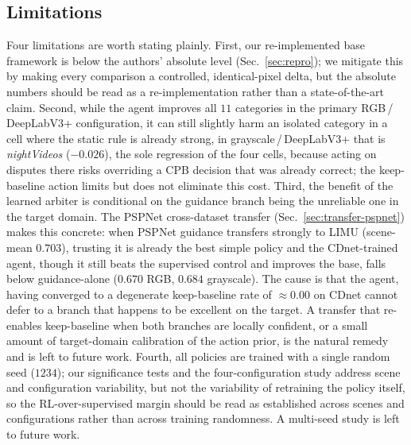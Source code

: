 \documentclass[sn-basic]{sn-jnl}
\begin{document}
\subsection{Limitations}
\label{sec:limits}
Four limitations are worth stating plainly. First, our re-implemented base framework
is below the authors' absolute level (Sec.~\ref{sec:repro}); we mitigate this by
making every comparison a controlled, identical-pixel delta, but the absolute numbers
should be read as a re-implementation rather than a state-of-the-art claim. Second,
while the agent improves all $11$ categories in the primary RGB\,/\,DeepLabV3+
configuration, it can still slightly harm an isolated category in a cell where the
static rule is already strong, in grayscale\,/\,DeepLabV3+ that is
\textit{nightVideos} ($-0.026$), the sole regression of the four cells, because
acting on disputes there risks overriding a CPB decision that was already correct; the
keep-baseline action limits but does not eliminate this cost. Third, the benefit of the
learned arbiter is conditional on the guidance branch being the unreliable one in the
target domain. The PSPNet cross-dataset transfer
(Sec.~\ref{sec:transfer-pspnet}) makes this concrete: when PSPNet guidance transfers
strongly to LIMU (scene-mean $0.703$), trusting it is already the best simple policy and
the CDnet-trained agent, though it still beats the supervised control and improves the
base, falls below guidance-alone ($0.670$ RGB, $0.684$ grayscale). The cause is that the
agent, having converged to a degenerate keep-baseline rate of $\approx0.00$ on CDnet
 cannot defer to a branch that happens to be excellent on the target. A transfer that
re-enables keep-baseline when both branches are locally confident, or a small amount of
target-domain calibration of the action prior, is the natural remedy and is left to
future work. Fourth, all policies are trained with a single random seed ($1234$); our
significance tests and the four-configuration study address scene and configuration
variability, but not the variability of retraining the policy itself, so the
RL-over-supervised margin should be read as established across scenes and configurations
rather than across training randomness. A multi-seed study is left to future work.

\end{document}

